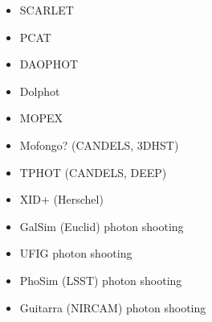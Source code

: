 \documentclass[modern]{aastex62}
\begin{document}
{\begin{itemize}
\item SCARLET
  
\item PCAT
\item DAOPHOT
\item Dolphot
\item MOPEX

\item Mofongo? (CANDELS, 3DHST)
\item TPHOT (CANDELS, DEEP) 
\item XID+ (Herschel)

\item GalSim (Euclid) photon shooting
\item UFIG photon shooting
\item PhoSim (LSST) photon shooting
\item Guitarra (NIRCAM) photon shooting

\end{itemize}

}
\end{document}
